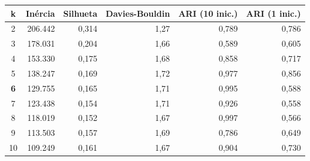 \begin{tabular}{crrrrr}
\toprule
k & Inércia & Silhueta & Davies-Bouldin & ARI (10 inic.) & ARI (1 inic.) \\
\midrule
2 & 206.442 & 0,314 & 1,27 & 0,789 & 0,786 \\
3 & 178.031 & 0,204 & 1,66 & 0,589 & 0,605 \\
4 & 153.330 & 0,175 & 1,68 & 0,858 & 0,717 \\
5 & 138.247 & 0,169 & 1,72 & 0,977 & 0,856 \\
\textbf{6} & 129.755 & 0,165 & 1,71 & 0,995 & 0,588 \\
7 & 123.438 & 0,154 & 1,71 & 0,926 & 0,558 \\
8 & 118.019 & 0,152 & 1,67 & 0,997 & 0,566 \\
9 & 113.503 & 0,157 & 1,69 & 0,786 & 0,649 \\
10 & 109.249 & 0,161 & 1,67 & 0,904 & 0,730 \\
\bottomrule
\end{tabular}
